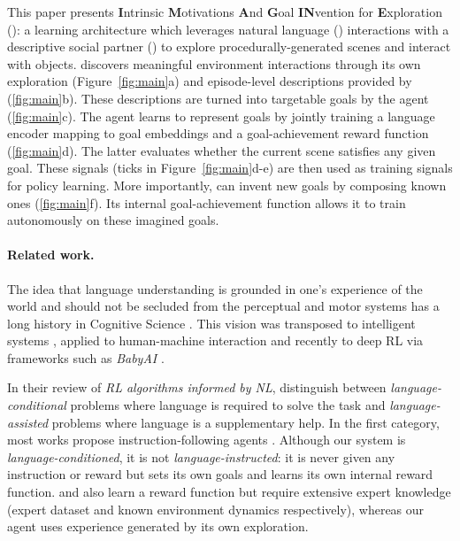 This paper presents \textbf{I}ntrinsic \textbf{M}otivations \textbf{A}nd \textbf{G}oal \textbf{IN}vention for \textbf{E}xploration (\imagine): a learning architecture which leverages natural language (\NL) interactions with a descriptive social partner (\SP) to explore procedurally-generated scenes and interact with objects. \imagine discovers meaningful environment interactions through its own exploration (Figure~\ref{fig:main}a) and episode-level \NL descriptions provided by \SP (\ref{fig:main}b). These descriptions are turned into targetable goals by the agent (\ref{fig:main}c). The agent learns to represent goals by jointly training a language encoder mapping \NL  to goal embeddings and a goal-achievement reward function (\ref{fig:main}d). The latter evaluates whether the current scene satisfies any given goal. These signals (ticks in Figure~\ref{fig:main}d-e) are then used as training signals for policy learning. More importantly, \imagine can invent new goals by composing known ones (\ref{fig:main}f). Its internal goal-achievement function allows it to train autonomously on these imagined goals.

    
\paragraph{Related work.} The idea that language understanding is grounded in one's experience of the world and should not be secluded from the perceptual and motor systems has a long history in Cognitive Science \cite{Glenberg2002,Zwaan05}. This vision was transposed to intelligent systems \cite{steels2006semiotic,mcclelland2019extending}, applied to human-machine interaction \cite{Dominey2005, Madden2010} and recently to deep RL via frameworks such as \textit{BabyAI} \cite{chevalier-boisvert2018babyai}.

In their review of \textit{RL algorithms informed by NL}, \citet{Luketina2019} distinguish between \textit{language-conditional} problems where language is required to solve the task and \textit{language-assisted} problems where language is a supplementary help. In the first category, most works propose instruction-following agents \cite{Branavan2010, Chen2011, bahdanau2018learning, coreyes2018guiding, Jiang2019, Goyal2019, ther}. Although our system is \textit{language-conditioned}, it is not \textit{language-instructed}: it is never given any instruction or reward but sets its own goals and learns its own internal reward function. \citet{bahdanau2018learning} and \citet{fu2018from} also learn a reward function but require extensive expert knowledge (expert dataset and known environment dynamics respectively), whereas our agent uses experience generated by its own exploration.

